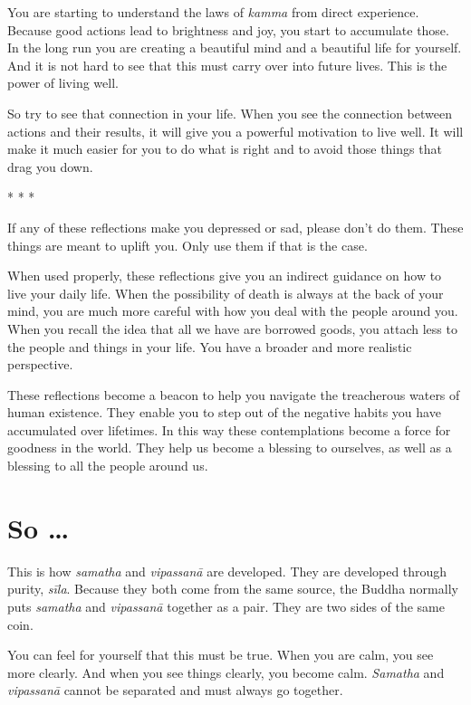 \documentclass[12pt,openany]{book}
\begin{document}
You are starting to understand the laws of \textit{kamma} from direct experience. Because good actions lead to brightness and joy, you start to accumulate those. In the long run you are creating a beautiful mind and a beautiful life for yourself. And it is not hard to see that this must carry over into future lives. This is the power of living well.

So try to see that connection in your life. When you see the connection between actions and their results, it will give you a powerful motivation to live well. It will make it much easier for you to do what is right and to avoid those things that drag you down.

\begin{center}
* * *
\end{center}

If any of these reflections make you depressed or sad, please don’t do them. These things are meant to uplift you. Only use them if that is the case.

When used properly, these reflections give you an indirect guidance on how to live your daily life. When the possibility of death is always at the back of your mind, you are much more careful with how you deal with the people around you. When you recall the idea that all we have are borrowed goods, you attach less to the people and things in your life. You have a broader and more realistic perspective.

These reflections become a beacon to help you navigate the treacherous waters of human existence. They enable you to step out of the negative habits you have accumulated over lifetimes. In this way these contemplations become a force for goodness in the world. They help us become a blessing to ourselves, as well as a blessing to all the people around us.

\chapter*{So …}

This is how \textit{samatha} and \textit{vipassanā} are developed. They are developed through purity, \textit{sīla}. Because they both come from the same source, the Buddha normally puts \textit{samatha} and \textit{vipassanā} together as a pair. They are two sides of the same coin.

You can feel for yourself that this must be true. When you are calm, you see more clearly. And when you see things clearly, you become calm. \textit{Samatha} and \textit{vipassanā} cannot be separated and must always go together.
\end{document}
